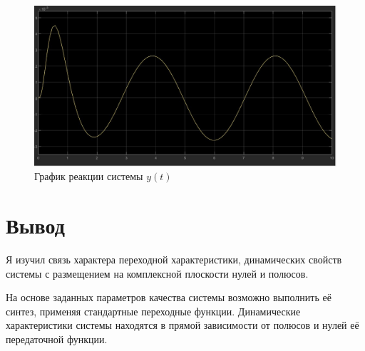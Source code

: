 \documentclass[a4paper, 12pt]{article}
\begin{document}
    \begin{figure}[H]
        \centering
        \includegraphics[scale=0.3]{task_3_y.jpg}
        \captionsetup{skip=0pt}
        \caption{График реакции системы $y(t)$}
        \label{fig:yt2}
    \end{figure}


    \section{Вывод}
    Я изучил связь характера переходной характеристики,
    динамических свойств системы с размещением на комплексной
    плоскости нулей и полюсов.


    На основе заданных параметров качества системы возможно выполнить её синтез,
    применяя стандартные переходные функции.
    Динамические характеристики системы находятся в прямой зависимости
    от полюсов и нулей её передаточной функции.
\end{document}
